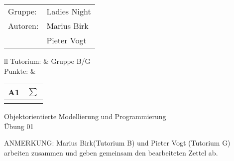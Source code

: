 \documentclass[12pt,a4paper,oneside,ngerman]{article}
\newcommand{\fach}{Objektorientierte Modellierung und Programmierung}
\newcommand{\dokumentenTitel}{Übung 01}
\begin{document}
	\thispagestyle{plain} %
	
	\begin{multicols}{2} %
		\hspace{-1cm} %
		\begin{tabular}{ll} %
			Gruppe: & Ladies Night \\
			Autoren: & Marius Birk \\ %
			& Pieter Vogt \\
		\end{tabular}
		
		\columnbreak %
		\hspace{-1cm} %
		\raggedleft \begin{tabular}{ll}
			Tutorium: &  Gruppe B/G \\
			Punkte: &     
			\renewcommand{\arraystretch}{1.2} %
			
			\begin{tabular}{|p{0.8cm}|p{0.8cm}|} %
				\hline A1&$\sum\limits^{ }$ \\ \hline %
				& \\ \hline   %
			\end{tabular}
		\end{tabular}	
	\end{multicols} %
	
	\begin{center}
		\Large{\fach} \\
		\LARGE{\dokumentenTitel} \\
		\small
\end{center}
ANMERKUNG: Marius Birk(Tutorium B) und Pieter Vogt (Tutorium G) arbeiten zusammen und geben gemeinsam den bearbeiteten Zettel ab.
\end{document}
